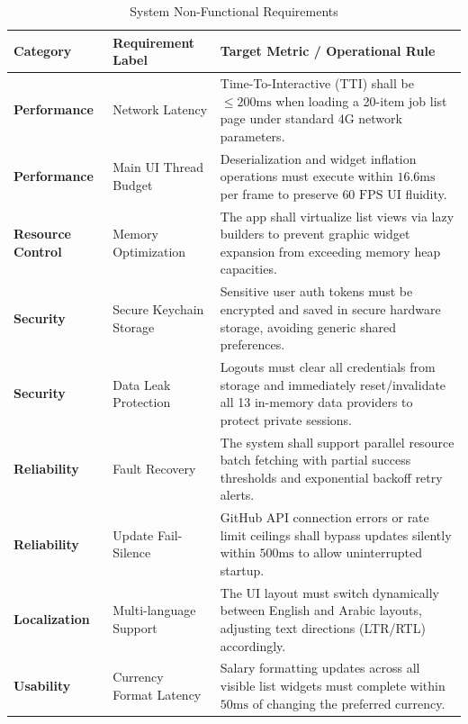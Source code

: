 \begin{table}[htbp]
\centering
\caption{System Non-Functional Requirements}
\label{tab:non_functional_requirements}
\begin{tabular}{|l|p{3.5cm}|p{6.5cm}|}
\hline
\textbf{Category} & \textbf{Requirement Label} & \textbf{Target Metric / Operational Rule} \\ \hline
\textbf{Performance} & Network Latency & Time-To-Interactive (TTI) shall be $\le 200\text{ms}$ when loading a 20-item job list page under standard 4G network parameters. \\ \hline
\textbf{Performance} & Main UI Thread Budget & Deserialization and widget inflation operations must execute within $16.6\text{ms}$ per frame to preserve $60\text{ FPS}$ UI fluidity. \\ \hline
\textbf{Resource Control} & Memory Optimization & The app shall virtualize list views via lazy builders to prevent graphic widget expansion from exceeding memory heap capacities. \\ \hline
\textbf{Security} & Secure Keychain Storage & Sensitive user auth tokens must be encrypted and saved in secure hardware storage, avoiding generic shared preferences. \\ \hline
\textbf{Security} & Data Leak Protection & Logouts must clear all credentials from storage and immediately reset/invalidate all 13 in-memory data providers to protect private sessions. \\ \hline
\textbf{Reliability} & Fault Recovery & The system shall support parallel resource batch fetching with partial success thresholds and exponential backoff retry alerts. \\ \hline
\textbf{Reliability} & Update Fail-Silence & GitHub API connection errors or rate limit ceilings shall bypass updates silently within $500\text{ms}$ to allow uninterrupted startup. \\ \hline
\textbf{Localization} & Multi-language Support & The UI layout must switch dynamically between English and Arabic layouts, adjusting text directions (LTR/RTL) accordingly. \\ \hline
\textbf{Usability} & Currency Format Latency & Salary formatting updates across all visible list widgets must complete within $50\text{ms}$ of changing the preferred currency. \\ \hline
\end{tabular}
\end{table}

